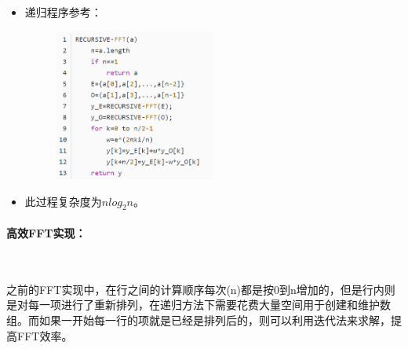 \documentclass[UTF8]{article}%
\begin{document}
\begin{itemize}
    最开始：$G_0=a_0$；$H_4=a_4$；$G_2=a_2$；$H_6=a_6$；$G_1=a_1$；$H_5=a_5$；$G_3=a_3$；$H_7=a_7$；\qquad n=1

    滚1次：$G_{04}=G_0+\omega(n)H_4$；$H_{26}=G_2+\omega(n)H_6$；$G_{15}=G_1+\omega(n)H_5$；$H_{37}=G_3+\omega(n)H_7$；\qquad n=2

    滚2次：$G_{0426}=G_{04}+\omega(n)H_{26}$；$G_{1537}=G_{15}+\omega(n)H_{37}$\qquad n=4

    滚3次：$Y=G_{0426}+\omega(n)H_{1537}$\qquad n=8

    得到了最终的y值。

    然后考虑纵向的回滚，记一开始为第0行：
    
    第一次：0->1\qquad n=2,m=1

    第二次：0->2,1->3\qquad n=4,m=2

    第三次：0->4,1->5,2->6,3->7 \qquad n=8,m=4

    最终求得了每一行的y值。

    注意：\textcolor{red}{除非最后一次(n)计算，其他次(n)的计算都是不完整的，因此每一个n下都需要重新计算所有的其余列。}

    \item 递归程序参考：
    
    {
        \begin{figure}[htb!]%
        \includegraphics[width=0.5\textwidth]{3-2.png}
        \end{figure}
    }
    
    \item 此过程复杂度为$nlog_2n$。
\end{itemize}

\paragraph{高效FFT实现：}~{}

之前的FFT实现中，在行之间的计算顺序每次(n)都是按0到n增加的，但是行内则是对每一项进行了重新排列，在递归方法下需要花费大量空间用于创建和维护数组。而如果一开始每一行的项就是已经是排列后的，则可以利用迭代法来求解，提高FFT效率。
\end{document}
